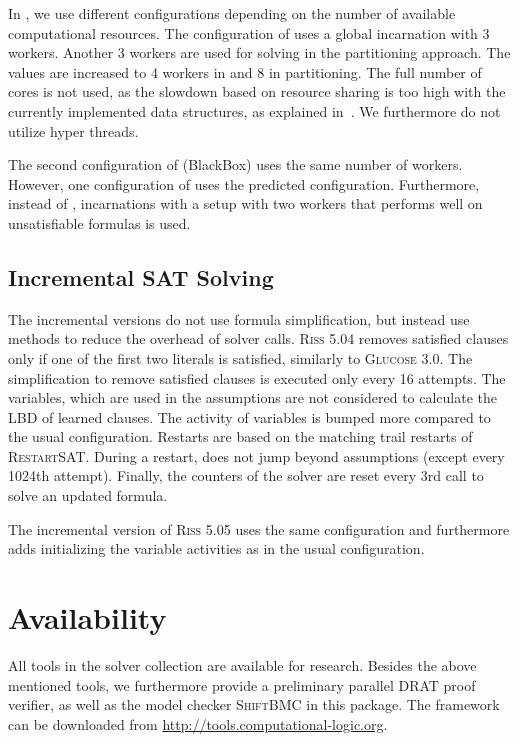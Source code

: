 \documentclass[conference]{IEEEtran}
\begin{document}
In \pcasso, we use different configurations depending on the number of available computational resources. 
The configuration of \pcasso uses a global \priss incarnation with $3$ workers. 
Another $3$ workers are used for solving in the partitioning approach. 
The values are increased to $4$ workers in \priss and $8$ in partitioning. 
The full number of cores is not used, as the slowdown based on resource sharing is too high with the currently implemented data structures, as explained in~\cite{portfolioSlowdown}. 
We furthermore do not utilize hyper threads. 

The second configuration of \pcasso (BlackBox) uses the same number of workers. 
However, one configuration of \priss uses the predicted configuration. 
Furthermore, instead of \riss, \priss incarnations with a setup with two workers that performs well on unsatisfiable formulas is used. 

\subsection{Incremental SAT Solving}

The incremental versions do not use formula simplification, but instead use methods to reduce the overhead of solver calls. 
\textsc{Riss 5.04} removes satisfied clauses only if one of the first two literals is satisfied, similarly to \textsc{Glucose 3.0}. 
The simplification to remove satisfied clauses is executed only every 16 attempts. 
The variables, which are used in the assumptions are not considered to calculate the LBD of learned clauses. 
The activity of variables is bumped more compared to the usual configuration. 
Restarts are based on the matching trail restarts of \textsc{RestartSAT}. 
During a restart, \riss does not jump beyond assumptions (except every 1024th attempt). 
Finally, the counters of the solver are reset every $3$rd call to solve an updated formula. 

The incremental version of \textsc{Riss 5.05} uses the same configuration and furthermore adds initializing the variable activities as in the usual configuration. 

\section{Availability}

All tools in the solver collection are available for research. 
Besides the above mentioned tools, we furthermore provide a preliminary parallel DRAT proof verifier, as well as the model checker \textsc{ShiftBMC} in this package.
The framework can be downloaded from \url{http://tools.computational-logic.org}.
\end{document}
